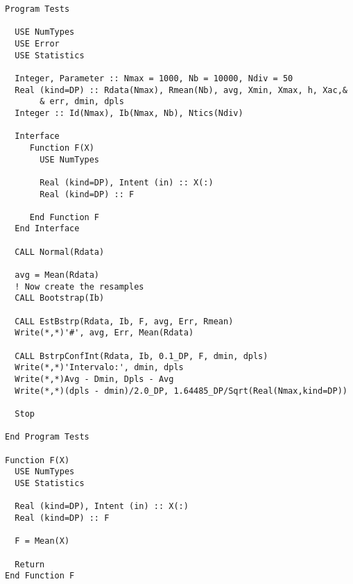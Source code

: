 \begin{lstlisting}[emph=BstrpConfInt,
                   emphstyle=\color{blue},
                   frame=trBL,
                   caption=Giving a confidence interval.,
                   label=BstrpConfInt]
Program Tests

  USE NumTypes
  USE Error
  USE Statistics

  Integer, Parameter :: Nmax = 1000, Nb = 10000, Ndiv = 50
  Real (kind=DP) :: Rdata(Nmax), Rmean(Nb), avg, Xmin, Xmax, h, Xac,&
       & err, dmin, dpls
  Integer :: Id(Nmax), Ib(Nmax, Nb), Ntics(Ndiv)

  Interface 
     Function F(X)
       USE NumTypes
         
       Real (kind=DP), Intent (in) :: X(:)
       Real (kind=DP) :: F
       
     End Function F
  End Interface
  
  CALL Normal(Rdata)

  avg = Mean(Rdata)
  ! Now create the resamples
  CALL Bootstrap(Ib)

  CALL EstBstrp(Rdata, Ib, F, avg, Err, Rmean)
  Write(*,*)'#', avg, Err, Mean(Rdata)

  CALL BstrpConfInt(Rdata, Ib, 0.1_DP, F, dmin, dpls)
  Write(*,*)'Intervalo:', dmin, dpls
  Write(*,*)Avg - Dmin, Dpls - Avg
  Write(*,*)(dpls - dmin)/2.0_DP, 1.64485_DP/Sqrt(Real(Nmax,kind=DP))

  Stop

End Program Tests

Function F(X)
  USE NumTypes
  USE Statistics
  
  Real (kind=DP), Intent (in) :: X(:)
  Real (kind=DP) :: F

  F = Mean(X)
  
  Return
End Function F
\end{lstlisting}




